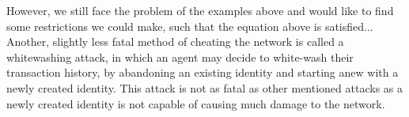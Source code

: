 \documentclass[11pt,a4paper]{report}
\theoremstyle{definition}
\theoremstyle{theorem}
\theoremstyle{proposition}
\theoremstyle{corollary}
\theoremstyle{lemma}
\theoremstyle{example}
\theoremstyle{remark}
\begin{document}
\noindent{}However, we still face the problem of the examples above and would like to find some restrictions we could make, such that the equation above is satisfied... \vspace{1em}\\ 



\noindent{}Another, slightly less fatal method of cheating the network is called a whitewashing attack, in which an agent may decide to white-wash their transaction history, by abandoning an existing identity and starting anew with a newly created identity. This attack is not as fatal as other mentioned attacks as a newly created identity is not capable of causing much damage to the network.\vspace{1em}\\
\end{document}
